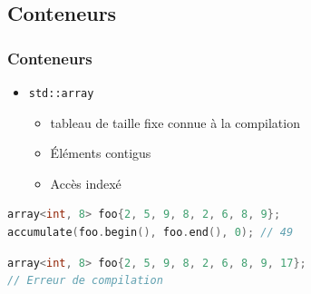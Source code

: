 \documentclass[C++.tex]{subfiles}
\begin{document}
\subsection*{Conteneurs}
\begin{frame}[fragile]
	\frametitle{Conteneurs}
	\begin{itemize}
		\item \lstinline|std::array|
		\begin{itemize}
			\item tableau de taille fixe connue à la compilation
			\item Éléments contigus
			\item Accès indexé
		\end{itemize}
	\end{itemize}

	\begin{lstlisting}[language=C++]
array<int, 8> foo{2, 5, 9, 8, 2, 6, 8, 9};
accumulate(foo.begin(), foo.end(), 0); // 49\end{lstlisting}

	\begin{lstlisting}[language=C++]
array<int, 8> foo{2, 5, 9, 8, 2, 6, 8, 9, 17};
// Erreur de compilation\end{lstlisting}
\end{frame}
\end{document}
